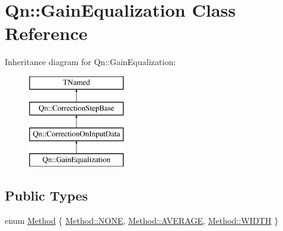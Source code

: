 \hypertarget{classQn_1_1GainEqualization}{}\section{Qn\+:\+:Gain\+Equalization Class Reference}
\label{classQn_1_1GainEqualization}
Inheritance diagram for Qn\+:\+:Gain\+Equalization\+:\begin{figure}[H]
\begin{center}
\leavevmode
\includegraphics[height=4.000000cm]{classQn_1_1GainEqualization}
\end{center}
\end{figure}
\subsection*{Public Types}
\begin{DoxyCompactItemize}
\item 
enum \mbox{\hyperlink{classQn_1_1GainEqualization_ab49157ee7419c78638467d5a070c2c23}{Method}} \{ \mbox{\hyperlink{classQn_1_1GainEqualization_ab49157ee7419c78638467d5a070c2c23ab50339a10e1de285ac99d4c3990b8693}{Method\+::\+N\+O\+NE}}, 
\mbox{\hyperlink{classQn_1_1GainEqualization_ab49157ee7419c78638467d5a070c2c23a16de38737a9f8366e9b2042b4e9b6290}{Method\+::\+A\+V\+E\+R\+A\+GE}}, 
\mbox{\hyperlink{classQn_1_1GainEqualization_ab49157ee7419c78638467d5a070c2c23a49da85b69bc6285eeee286ca49fa7195}{Method\+::\+W\+I\+D\+TH}}
 \}
\end{DoxyCompactItemize}
